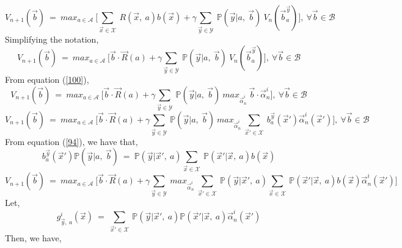 \documentclass[12pt, draftcls, onecolumn]{IEEEtran}
\begin{document}
\begin{itemize}
    \begin{equation*}
        V_{n+1}(\vec{b})\ =\ max_{a \in \mathcal{A}}\ \Big[\sum_{\vec{x} \in \mathcal{X}}\ R(\vec{x},\ a)b(\vec{x}) + \gamma \sum_{\vec{y} \in \mathcal{Y}}\ \mathbb{P}(\vec{y}|a,\ \vec{b})\ V_n(\vec{b}_a^{\vec{y}})\Big],\ \forall \vec{b} \in \mathcal{B}
    \end{equation*}
    Simplifying the notation,
    \begin{equation*}
        V_{n+1}(\vec{b})\ =\ max_{a \in \mathcal{A}}\ \Big[\vec{b} \cdot \vec{R}(a) + \gamma \sum_{\vec{y} \in \mathcal{Y}}\ \mathbb{P}(\vec{y}|a,\ \vec{b})\ V_n(\vec{b}_a^{\vec{y}})\Big],\ \forall \vec{b} \in \mathcal{B}
    \end{equation*}
    From equation (\ref{100}),
    \begin{equation*}
        V_{n+1}(\vec{b})\ =\ max_{a \in \mathcal{A}}\ \Big[\vec{b} \cdot \vec{R}(a) + \gamma \sum_{\vec{y} \in \mathcal{Y}}\ \mathbb{P}(\vec{y}|a,\ \vec{b})\ max_{\vec{\alpha}^i_n}\ \vec{b} \cdot \vec{\alpha}^i_n\Big],\ \forall \vec{b} \in \mathcal{B}
    \end{equation*}
    \begin{equation*}
        V_{n+1}(\vec{b})\ =\ max_{a \in \mathcal{A}}\ \Big[\vec{b} \cdot \vec{R}(a) + \gamma \sum_{\vec{y} \in \mathcal{Y}}\ \mathbb{P}(\vec{y}|a,\ \vec{b})\ max_{\vec{\alpha}^i_n}\ \sum_{\vec{x}' \in \mathcal{X}}\ b_a^{\vec{y}}(\vec{x}')\vec{\alpha}_n^i(\vec{x}')\Big],\ \forall \vec{b} \in \mathcal{B}
    \end{equation*}
    From equation (\ref{94}), we have that,
    \begin{equation*}
        b_a^{\vec{y}}(\vec{x}')\mathbb{P}(\vec{y}|a,\ \vec{b})\ =\ \mathbb{P}(\vec{y}|\vec{x}',\ a)\sum_{\vec{x} \in \mathcal{X}}\ \mathbb{P}(\vec{x}'|\vec{x},\ a)b(\vec{x})
    \end{equation*}
    \begin{equation*}
            V_{n+1}(\vec{b})\ =\ max_{a \in \mathcal{A}}\ \Big[\vec{b} \cdot \vec{R}(a) + \gamma \sum_{\vec{y} \in \mathcal{Y}}\ max_{\vec{\alpha}^i_n}\ \sum_{\vec{x}' \in \mathcal{X}}\ \mathbb{P}(\vec{y}|\vec{x}',\ a)\sum_{\vec{x} \in \mathcal{X}}\ \mathbb{P}(\vec{x}'|\vec{x},\ a)b(\vec{x})\vec{\alpha}_n^i(\vec{x}')\Big]
    \end{equation*}
    Let,
    \[g_{\vec{y},\ a}^i(\vec{x})\ =\ \sum_{\vec{x}' \in \mathcal{X}}\ \mathbb{P}(\vec{y}|\vec{x}',\ a)\mathbb{P}(\vec{x}'|\vec{x},\ a)\vec{\alpha}_n^i(\vec{x}')\]
    Then, we have,
    \begin{equation*}

\end{equation*}
\end{itemize}
\end{document}
